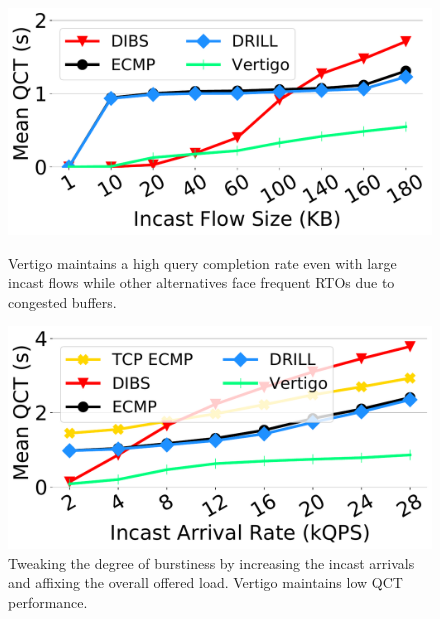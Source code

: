 \begin{figure}[t]
  \begin{minipage}[b]{0.48\textwidth}
	\includegraphics[width=0.98\linewidth]{figs/flowsize50qct.pdf}
	\caption{\small{Vertigo maintains a high query completion rate even with large incast flows while other alternatives face frequent RTOs due to congested buffers.}}
	\label{fig:size}
  \end{minipage}
  \hfill
  \begin{minipage}[b]{0.48\textwidth}
	\centering
	\includegraphics[width=0.98\linewidth]{figs/burst80.pdf}
	\caption{\small{Tweaking the degree of burstiness by increasing the incast arrivals and affixing the overall offered load. Vertigo maintains low QCT performance.}}
	\label{fig:burstiness80}
  \end{minipage}
  \vspace{-2mm}
\end{figure}

